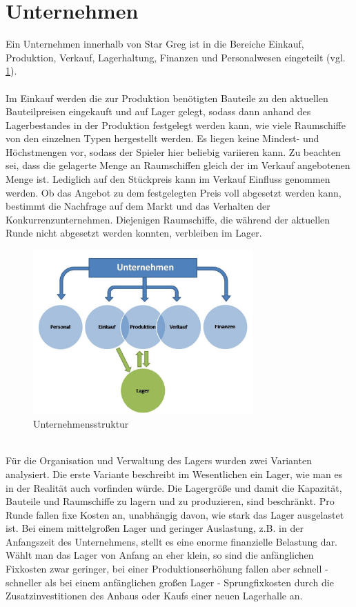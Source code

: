 \section{Unternehmen}
\label{sec:spielwelt-unternehmen}


Ein Unternehmen innerhalb von Star Greg ist in die Bereiche Einkauf, Produktion, Verkauf, Lagerhaltung, Finanzen und Personalwesen eingeteilt (vgl. \ref{fig:spielwelt-unternehmen}). 
\\
\\
Im Einkauf werden die zur Produktion benötigten Bauteile zu den aktuellen Bauteilpreisen eingekauft und auf Lager gelegt, sodass dann anhand des Lagerbestandes in der Produktion festgelegt werden kann, wie viele Raumschiffe von den einzelnen Typen hergestellt werden. Es liegen keine Mindest- und Höchstmengen vor, sodass der Spieler hier beliebig variieren kann. Zu beachten sei, dass die gelagerte Menge an Raumschiffen gleich der im Verkauf angebotenen Menge ist. Lediglich auf den Stückpreis kann im Verkauf Einfluss genommen werden. Ob das Angebot zu dem festgelegten Preis voll abgesetzt werden kann, bestimmt die Nachfrage auf dem Markt und das Verhalten der Konkurrenzunternehmen. Diejenigen Raumschiffe, die während der aktuellen Runde nicht abgesetzt werden konnten, verbleiben im Lager. 
\\
\begin{figure}[htb]
\centering
\includegraphics[width=0.75\textwidth]{20_Spielwelt/20_Unternehmen/Unternehmensstruktur.jpg}
\caption{Unternehmensstruktur}\label{fig:spielwelt-unternehmen}
\end{figure}
\\
Für die Organisation und Verwaltung des Lagers wurden zwei Varianten analysiert. Die erste Variante beschreibt im Wesentlichen  ein Lager, wie man es in der Realität auch vorfinden würde. Die Lagergröße und damit die Kapazität, Bauteile und Raumschiffe zu lagern und zu produzieren, sind beschränkt. Pro Runde fallen fixe Kosten an, unabhängig davon, wie stark das Lager ausgelastet ist. Bei einem mittelgroßen Lager und geringer Auslastung, z.B. in der Anfangszeit des Unternehmens, stellt es eine enorme finanzielle Belastung dar. Wählt man das Lager von Anfang an eher klein, so sind die anfänglichen Fixkosten zwar geringer, bei einer Produktionserhöhung fallen aber schnell - schneller als bei einem anfänglichen großen Lager - Sprungfixkosten durch die Zusatzinvestitionen des Anbaus oder Kaufs einer neuen Lagerhalle an. 

